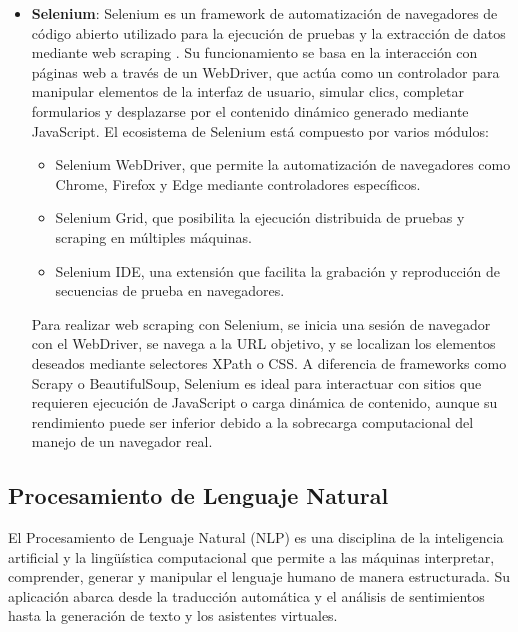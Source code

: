 \begin{itemize}
    \item \textbf{Selenium}: Selenium es un framework de automatización de navegadores de código abierto utilizado para la ejecución de pruebas y la extracción de datos mediante web scraping \cite{9142938}. 
    Su funcionamiento se basa en la interacción con páginas web a través de un WebDriver, que actúa como un controlador para manipular elementos de la interfaz de usuario, simular clics, completar formularios y desplazarse por el contenido dinámico generado mediante JavaScript.
    El ecosistema de Selenium está compuesto por varios módulos:

    \begin{itemize}
        \item Selenium WebDriver, que permite la automatización de navegadores como Chrome, Firefox y Edge mediante controladores específicos.
        \item Selenium Grid, que posibilita la ejecución distribuida de pruebas y scraping en múltiples máquinas.
        \item Selenium IDE, una extensión que facilita la grabación y reproducción de secuencias de prueba en navegadores.
    \end{itemize}

    Para realizar web scraping con Selenium, se inicia una sesión de navegador con el WebDriver, se navega a la URL objetivo, y se localizan los elementos deseados mediante selectores XPath o CSS. A diferencia de frameworks como Scrapy o BeautifulSoup, Selenium es ideal para interactuar con sitios que requieren ejecución de JavaScript o carga dinámica de contenido, aunque su rendimiento puede ser inferior debido a la sobrecarga computacional del manejo de un navegador real.

\end{itemize}

\subsection{Procesamiento de Lenguaje Natural}

El Procesamiento de Lenguaje Natural (NLP) es una disciplina de la inteligencia artificial y la lingüística computacional que permite a las máquinas interpretar, comprender, generar y manipular el lenguaje humano de manera estructurada. 
Su aplicación abarca desde la traducción automática y el análisis de sentimientos hasta la generación de texto y los asistentes virtuales.



